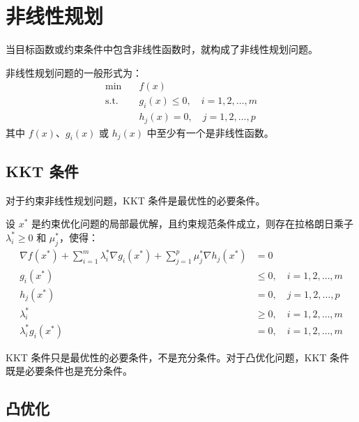 \section{非线性规划}\label{sec:nonlinear-programming}

当目标函数或约束条件中包含非线性函数时，就构成了非线性规划问题。

\begin{definition}[非线性规划]\label{def:nonlinear-programming}
非线性规划问题的一般形式为：
\begin{align}
\min \quad & f(x) \\
\text{s.t.} \quad & g_i(x) \leq 0, \quad i = 1, 2, \ldots, m \\
& h_j(x) = 0, \quad j = 1, 2, \ldots, p
\end{align}
其中 $f(x)$、$g_i(x)$ 或 $h_j(x)$ 中至少有一个是非线性函数。
\end{definition}

\subsection{KKT 条件}

对于约束非线性规划问题，KKT 条件是最优性的必要条件。

\begin{theorem}[KKT 条件]\label{thm:kkt-conditions}
设 $x^*$ 是约束优化问题的局部最优解，且约束规范条件成立，则存在拉格朗日乘子 $\lambda_i^* \geq 0$ 和 $\mu_j^*$，使得：
\begin{align}
\nabla f(x^*) + \sum_{i=1}^m \lambda_i^* \nabla g_i(x^*) + \sum_{j=1}^p \mu_j^* \nabla h_j(x^*) &= 0 \\
g_i(x^*) &\leq 0, \quad i = 1, 2, \ldots, m \\
h_j(x^*) &= 0, \quad j = 1, 2, \ldots, p \\
\lambda_i^* &\geq 0, \quad i = 1, 2, \ldots, m \\
\lambda_i^* g_i(x^*) &= 0, \quad i = 1, 2, \ldots, m
\end{align}
\end{theorem}

\begin{warningbox}[title=注意]
KKT 条件只是最优性的必要条件，不是充分条件。对于凸优化问题，KKT 条件既是必要条件也是充分条件。
\end{warningbox}

\subsection{凸优化}

